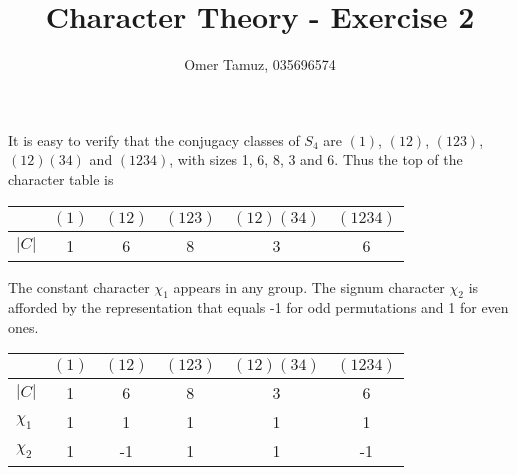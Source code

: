 \documentclass[11pt]{article} \usepackage{amssymb}
\begin{document}
\title{Character Theory - Exercise 2}

 \author{Omer Tamuz, 035696574}
\maketitle

It is easy to verify that the conjugacy classes of $S_4$ are $(1)$,
$(12)$, $(123)$, $(12)(34)$ and $(1234)$, with sizes 1, 6, 8, 3 and
6. Thus the top of the character table is
\begin{table}[h]
\begin{center}
{\small
\begin{tabular}{ l | c | c | c | c | c }
  & $(1)$ & $(12)$ & $(123)$ & $(12)(34)$ & $(1234)$ \\
\hline
$|C|$ & 1 & 6 & 8 & 3 & 6\\
\end{tabular}
}
\end{center}
\end{table}

The constant character $\chi_1$ appears in any group. The signum
character $\chi_2$ is afforded by the representation that equals -1 for
odd permutations and 1 for even ones.
\begin{table}[h]
\begin{center}
{\small
\begin{tabular}{ l | c | c | c | c | c }
  & $(1)$ & $(12)$ & $(123)$ & $(12)(34)$ & $(1234)$ \\
\hline
$|C|$ & 1 & 6 & 8 & 3 & 6\\
\hline
$\chi_1$ & 1 & 1 & 1 & 1 & 1\\
$\chi_2$ & 1 & -1 & 1 & 1 & -1\\
\end{tabular}
}
\end{center}
\end{table}
\end{document}
